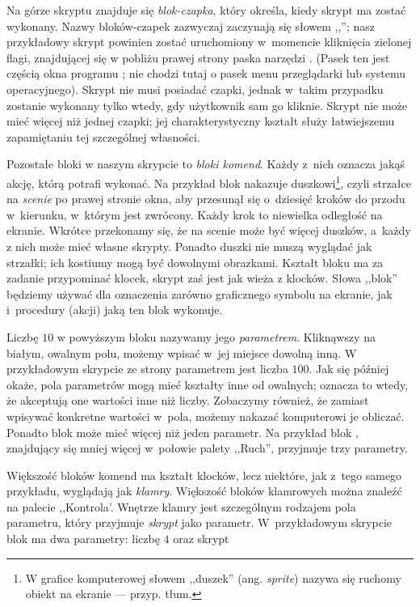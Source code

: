\documentclass{report}
\begin{document}
Na górze skryptu znajduje się \emph{blok-czapka}, który określa, kiedy skrypt ma zostać wykonany. Nazwy bloków-czapek zazwyczaj zaczynają się słowem ,,''; nasz przykładowy skrypt powinien zostać uruchomiony w~momencie kliknięcia zielonej flagi, znajdującej się w pobliżu prawej strony paska narzędzi . (Pasek ten jest częścią okna programu \Snap{}; nie chodzi tutaj o pasek menu przeglądarki lub systemu operacyjnego). Skrypt nie musi posiadać czapki, jednak w~takim przypadku zostanie wykonany tylko wtedy, gdy użytkownik sam go kliknie. Skrypt nie może mieć więcej niż jednej czapki; jej charakterystyczny kształt służy łatwiejszemu zapamiętaniu tej szczególnej własności.

Pozostałe bloki w naszym skrypcie to \emph{bloki komend}. Każdy z~nich oznacza jakąś akcję, którą \Snap{} potrafi wykonać. Na przykład blok  nakazuje duszkowi\footnote{W grafice komputerowej słowem ,,duszek'' (ang. \textit{sprite}) nazywa się ruchomy obiekt na ekranie --- przyp. tłum.}, czyli strzałce na \emph{scenie} po prawej stronie okna, aby przesunął się o~dziesięć kroków do przodu w~kierunku, w~którym jest zwrócony. Każdy krok to niewielka odległość na ekranie. Wkrótce przekonamy się, że na scenie może być więcej duszków, a~każdy z nich może mieć własne skrypty. Ponadto duszki nie muszą wyglądać jak strzałki; ich kostiumy mogą być dowolnymi obrazkami. Kształt bloku  ma za zadanie przypominać klocek, skrypt zaś jest jak wieża z klocków. Słowa ,,blok'' będziemy używać dla oznaczenia zarówno graficznego symbolu na ekranie, jak i~procedury (akcji) jaką ten blok wykonuje.

Liczbę $10$ w powyższym bloku  nazywamy jego \emph{parametrem}. Kliknąwszy na białym, owalnym polu, możemy wpisać w~jej miejsce dowolną inną. W przykładowym skrypcie ze strony \pageref{fig:typowy-skrypt} parametrem jest liczba $100$. Jak się później okaże, pola parametrów mogą mieć kształty inne od owalnych; oznacza to wtedy, że akceptują one wartości inne niż liczby. Zobaczymy również, że zamiast wpisywać konkretne wartości w~pola, możemy nakazać komputerowi je obliczać. Ponadto blok może mieć więcej niż jeden parametr. Na przykład blok , znajdujący się mniej więcej w~połowie palety ,,Ruch'', przyjmuje trzy parametry.

Większość bloków komend ma kształt klocków, lecz niektóre, jak  z~tego samego przykładu, wyglądają jak \emph{klamry}. Większość bloków klamrowych można znaleźć na palecie ,,Kontrola'. Wnętrze klamry jest szczególnym rodzajem pola parametru, który przyjmuje \emph{skrypt} jako parametr. W~przykładowym skrypcie blok  ma dwa parametry: liczbę $4$ oraz skrypt
\end{document}

